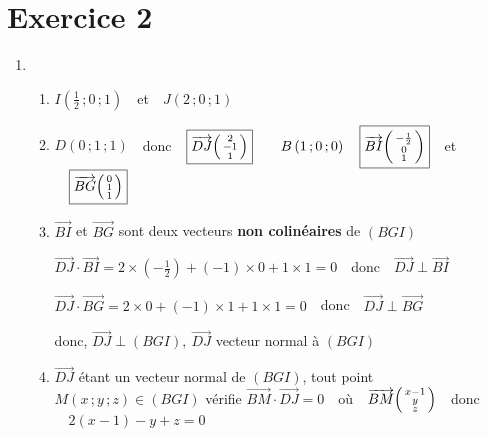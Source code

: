 \documentclass{scrartcl}
\begin{document}
    \section*{Exercice 2}
    \begin{adjustwidth}{2em}{0pt}
        \begin{enumerate}
            \item \begin{enumerate}[label=\alph*)]
                \item   $\boxed{I\left(\tfrac{1}{2}\,;0\,;1\right)}\quad$et$\quad \boxed{J\left(2\,;0\,;1\right)}$
                \item   $D\left(0\,;1\,;1\right)\quad$donc$\quad\boxed{\overrightarrow{DJ}\begin{psmallmatrix}2 \\ -1 \\ 1\end{psmallmatrix}}\qquad B\left(1\,;0\,;0\right)\quad\boxed{\overrightarrow{BI}\begin{psmallmatrix}-\frac{1}{2} \\ 0 \\ 1\end{psmallmatrix}}\quad$et$\quad\boxed{\overrightarrow{BG}\begin{psmallmatrix}0 \\ 1 \\ 1\end{psmallmatrix}}$
                \item   $\overrightarrow{BI}$ et $\overrightarrow{BG}$ sont deux vecteurs \textbf{non colinéaires} de $(BGI)$ \par
                 $\overrightarrow{DJ}\cdot\overrightarrow{BI}=2\times\left(-\frac{1}{2}\right)+\left(-1\right)\times 0+1\times 1=0\quad$donc$\quad\overrightarrow{DJ}\perp\overrightarrow{BI}$ \par
                 $\overrightarrow{DJ}\cdot\overrightarrow{BG}=2\times 0+(-1)\times 1+1\times 1=0\quad$donc$\quad \overrightarrow{DJ}\perp\overrightarrow{BG}$ \par
                 \hspace{2em} donc, $\boxed{\overrightarrow{DJ}\perp(BGI)},\ \overrightarrow{DJ}$ vecteur normal à $(BGI)$
                \item   $\overrightarrow{DJ}$ étant un vecteur normal de $(BGI)$, tout point $M(x\,;y\,;z)\in(BGI)$ vérifie \linebreak $\overrightarrow{BM}\cdot\overrightarrow{DJ}=0\quad$où$\quad\overrightarrow{BM}\begin{psmallmatrix}x-1 \\ y \\ z\end{psmallmatrix}\quad$donc$\quad 2(x-1)-y+z=0$ \par

\end{enumerate}
\end{enumerate}
\end{adjustwidth}
\end{document}
